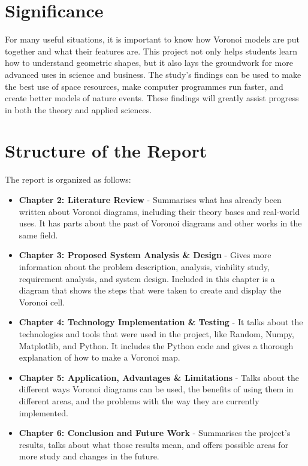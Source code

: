 \documentclass[12pt,a4paper]{report}
\begin{document}
\section{Significance}
For many useful situations, it is important to know how Voronoi models are put together and what their features are. This project not only helps students learn how to understand geometric shapes, but it also lays the groundwork for more advanced uses in science and business. The study's findings can be used to make the best use of space resources, make computer programmes run faster, and create better models of nature events. These findings will greatly assist progress in both the theory and applied sciences.

\section{Structure of the Report}
The report is organized as follows:
\begin{itemize}
  \item \textbf{Chapter 2: Literature Review} - Summarises what has already been written about Voronoi diagrams, including their theory bases and real-world uses. It has parts about the past of Voronoi diagrams and other works in the same field.
  \item \textbf{Chapter 3: Proposed System Analysis \& Design} - Gives more information about the problem description, analysis, viability study, requirement analysis, and system design. Included in this chapter is a diagram that shows the steps that were taken to create and display the Voronoi cell.
  \item \textbf{Chapter 4: Technology Implementation \& Testing} - It talks about the technologies and tools that were used in the project, like Random, Numpy, Matplotlib, and Python. It includes the Python code and gives a thorough explanation of how to make a Voronoi map.
  \item \textbf{Chapter 5: Application, Advantages \& Limitations} - Talks about the different ways Voronoi diagrams can be used, the benefits of using them in different areas, and the problems with the way they are currently implemented.
  
  \item \textbf{Chapter 6: Conclusion and Future Work} - Summarises the project's results, talks about what those results mean, and offers possible areas for more study and changes in the future.
\end{itemize}
\end{document}
